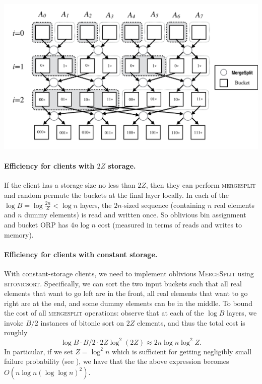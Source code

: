 \includegraphics[scale=0.45]{fig2.png}

\paragraph{Efficiency for clients with $2Z$ storage.}

If the client has a storage size no less than $2Z$, then they can perform \textsc{mergesplit} and random permute the buckets at the final layer locally. In each of the $\log B = \log \frac{2n}{Z} < \log n$ layers, the $2n$-sized sequence (containing $n$ real elements and $n$ dummy elements) is read  and written once. So oblivious bin assignment and bucket ORP has $4n\log n$ cost (measured
in terms of reads and writes to memory). 

\paragraph{Efficiency for clients with constant storage.}
With constant-storage clients, we need to implement oblivious \textsc{MergeSplit} using \textsc{bitonicsort}. 
Specifically, we can sort the two input buckets such that all
real elements that want to go left  
are in the front, all real elements that want to go right are at the end,
and some dummy elements can be in the middle.
To bound the cost of all \textsc{mergesplit} operations:
observe that 
at each of the $\log B$ layers, we invoke $B/2$ 
instances of bitonic sort on $2Z$ elements,
and thus the total cost 
is roughly 
\[
\log B\cdot B/2\cdot 2Z\log^2(2Z)
\approx 2n\log n\log^2Z.\]
In particular, if we set $Z = \log^2 n$ which is sufficient
for getting negligibly small failure probability
(see ), we have that the  
the above expression becomes $O(n \log n (\log \log n)^2)$.



